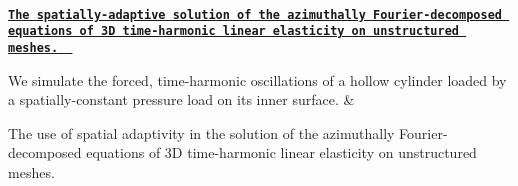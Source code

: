 \begin{longtabu}
\\
\href{../../time_harmonic_fourier_decomposed_linear_elasticity/adaptive_pressure_loaded_cylinder/html/index.html}{\tt {\bfseries The spatially-\/adaptive solution of the azimuthally Fourier-\/decomposed equations of 3D time-\/harmonic linear elasticity on unstructured meshes. } }

We simulate the forced, time-\/harmonic oscillations of a hollow cylinder loaded by a spatially-\/constant pressure load on its inner surface.  &
\begin{DoxyItemize}
\item The use of spatial adaptivity in the solution of the azimuthally Fourier-\/decomposed equations of 3D time-\/harmonic linear elasticity on unstructured meshes.
\end{DoxyItemize}



\\
\end{longtabu}
\tabulinesep=1mm
